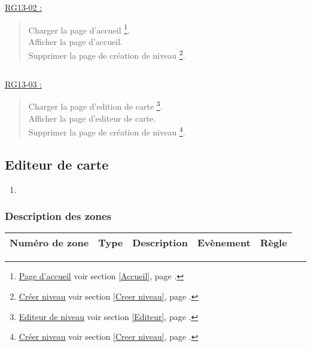 \documentclass{report}
\begin{document}
			$\,$

			\underline{RG13-02 :}
				\begin{quote}
					Charger la page d'accueil%
						\footnote[2]{
							\hyperlink{Page d'accueil}{Page d'accueil}
							\og voir section \ref{Accueil}, page \pageref{Accueil}.\fg
						}.\\
					Afficher la page d'accueil\footnotemark[2].\\
					Supprimer la page de création de niveau%
					\footnote[3]{
						\hyperlink{Creer niveau}{Créer niveau}
						\og voir section \ref{Creer niveau}, page \pageref{Creer niveau}.\fg
					}.
				\end{quote}
				
			$\,$
			
			\underline{RG13-03 :}
				\begin{quote}
					Charger la page d'edition de carte%
					\footnote[2]{
							\hyperlink{Editeur}{Editeur de niveau}
							\og voir section \ref{Editeur}, page \pageref{Editeur}.\fg
						}.\\
					Afficher la page d'editeur de carte\footnotemark[2].\\
					Supprimer la page de création de niveau%
					\footnote[3]{
						\hyperlink{Creer niveau}{Créer niveau}
						\og voir section \ref{Creer niveau}, page \pageref{Creer niveau}.\fg
					}.
				\end{quote}
				
				
\newpage

	\subsection{Editeur de carte}
		
		\hypertarget{Editeur de carte}{}
		\label{Editeur de carte}
			
		\begin{center}
			
		\end{center}
		
		\begin{enumerate}
		  \item 
		\end{enumerate}

		\subsubsection{Description des zones}
		
			\begin{tabular}{|c|c|c|c|c|} \hline
				Numéro de zone & Type  & Description & Evènement &	Règle \\\hline
			\end{tabular}
			
\end{document}
